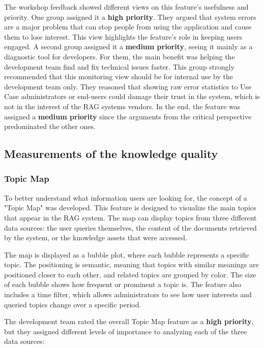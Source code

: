 \documentclass[
	english,
	ruledheaders=section,%
	class=report,%
	thesis={type=bachelor},%
	accentcolor=1b,%
	custommargins=true,%
	marginpar=false,%
	parskip=half-,%
	fontsize=11pt,%
	DIV=14,
]{tudapub}
\begin{document}
The workshop feedback showed different views on this feature's usefulness and priority. One group assigned it a \textbf{high priority}. They argued that system errors are a major problem that can stop people from using the application and cause them to lose interest. This view highlights the feature's role in keeping users engaged. A second group assigned it a \textbf{medium priority}, seeing it mainly as a diagnostic tool for developers. For them, the main benefit was helping the development team find and fix technical issues faster. This group strongly recommended that this monitoring view should be for internal use by the development team only. They reasoned that showing raw error statistics to Use Case administrators or end-users could damage their trust in the system, which is not in the interest of the RAG systems vendors. In the end, the feature was assigned a \textbf{medium priority} since the arguments from the critical perspective predominated the other ones.
\subsection{Measurements of the knowledge quality}
\subsubsection{Topic Map}
To better understand what information users are looking for, the concept of a "Topic Map" was developed. This feature is designed to visualize the main topics that appear in the RAG system. The map can display topics from three different data sources: the user queries themselves, the content of the documents retrieved by the system, or the knowledge assets that were accessed.

The map is displayed as a bubble plot, where each bubble represents a specific topic. The positioning is semantic, meaning that topics with similar meanings are positioned closer to each other, and related topics are grouped by color. The size of each bubble shows how frequent or prominent a topic is. The feature also includes a time filter, which allows administrators to see how user interests and queried topics change over a specific period.

The development team rated the overall Topic Map feature as a \textbf{high priority}, but they assigned different levels of importance to analyzing each of the three data sources:
\end{document}

